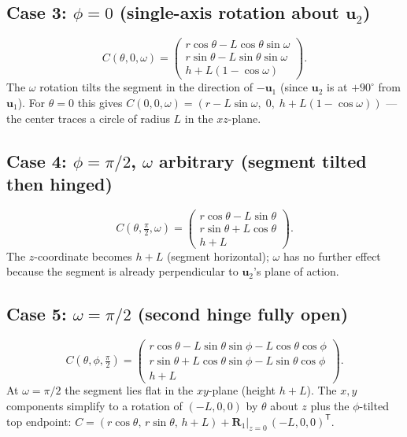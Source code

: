 \documentclass[12pt,a4paper]{article}
\newcommand{\uva}{\mathbf{u}_1}
\newcommand{\uvb}{\mathbf{u}_2}
\newcommand{\Rd}{\mathbf{R}}
\newcommand{\Rone}{\Rd_1}
\begin{document}
\subsection*{Case 3: $\phi = 0$ (single-axis rotation about $\uvb$)}

\[
C(\theta,0,\omega) = \begin{pmatrix}
    r\cos\theta - L\cos\theta\sin\omega \\
    r\sin\theta - L\sin\theta\sin\omega \\
    h + L(1-\cos\omega)
  \end{pmatrix}.
\]
The $\omega$ rotation tilts the segment in the direction of $-\uva$ (since
$\uvb$ is at $+90^\circ$ from $\uva$).  For $\theta=0$ this gives
$C(0,0,\omega) = (r - L\sin\omega,\; 0,\; h+L(1-\cos\omega))$ --- the
center traces a circle of radius $L$ in the $xz$-plane. 

\subsection*{Case 4: $\phi = \pi/2$, $\omega$ arbitrary (segment tilted then hinged)}

\[
C(\theta,\tfrac{\pi}{2},\omega) = \begin{pmatrix}
    r\cos\theta - L\sin\theta \\
    r\sin\theta + L\cos\theta \\
    h + L
  \end{pmatrix}.
\]
The $z$-coordinate becomes $h+L$ (segment horizontal); $\omega$ has no further
effect because the segment is already perpendicular to $\uvb$'s plane of action. 

\subsection*{Case 5: $\omega = \pi/2$ (second hinge fully open)}

\[
C(\theta,\phi,\tfrac{\pi}{2}) = \begin{pmatrix}
    r\cos\theta - L\sin\theta\sin\phi - L\cos\theta\cos\phi \\
    r\sin\theta + L\cos\theta\sin\phi - L\sin\theta\cos\phi \\
    h + L
  \end{pmatrix}.
\]
At $\omega=\pi/2$ the segment lies flat in the $xy$-plane (height $h+L$).
The $x,y$ components simplify to a rotation of $(-L,0,0)$ by $\theta$ about $z$
plus the $\phi$-tilted top endpoint:
$C = (r\cos\theta,\, r\sin\theta,\, h+L) + \Rone\bigl|_{z=0}\,(-L,0,0)^\mathsf{T}$. 
\end{document}
